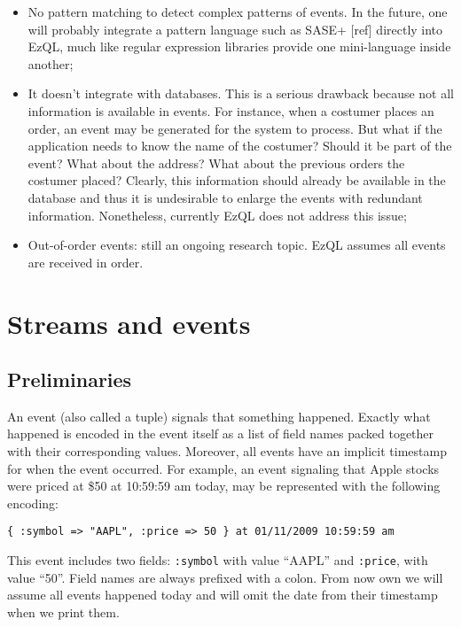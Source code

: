 \documentclass{report}
\begin{document}
\begin{itemize}
\item No pattern matching to detect complex patterns of events. In the
  future, one will probably integrate a pattern language such as SASE+
  [ref] directly into EzQL, much like regular expression libraries
  provide one mini-language inside another;
\item It doesn't integrate with databases. This is a serious drawback
  because not all information is available in events. For instance,
  when a costumer places an order, an event may be generated for the
  system to process. But what if the application needs to know the
  name of the costumer? Should it be part of the event? What about the
  address? What about the previous orders the costumer placed?
  Clearly, this information should already be available in the
  database and thus it is undesirable to enlarge the events with
  redundant information. Nonetheless, currently EzQL does not address
  this issue;
\item Out-of-order events: still an ongoing research topic. EzQL
  assumes all events are received in order.
\end{itemize}

\chapter{Streams and events}
\label{chap:streams-events}

\section{Preliminaries}

An event (also called a tuple) signals that something
happened. Exactly what happened is encoded in the event itself as a
list of field names packed together with their corresponding
values. Moreover, all events have an implicit timestamp for when the
event occurred. For example, an event signaling that Apple stocks were
priced at \$50 at 10:59:59 am today, may be represented with the
following encoding:

\begin{verbatim}
{ :symbol => "AAPL", :price => 50 } at 01/11/2009 10:59:59 am
\end{verbatim}

This event includes two fields: \verb=:symbol= with value ``AAPL'' and
\verb=:price=, with value ``50''. Field names are always prefixed with
a colon. From now own we will assume all events happened today and
will omit the date from their timestamp when we print them.
\end{document}
